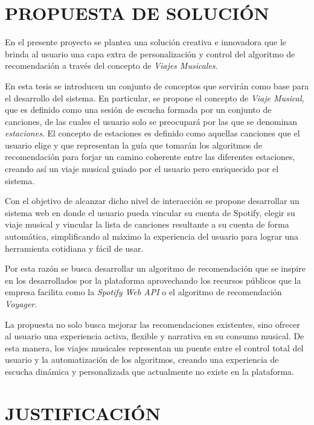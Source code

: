 \newpage

\section*{PROPUESTA DE SOLUCIÓN}

En el presente proyecto se plantea una solución creativa e innovadora que le brinda al usuario una capa extra de personalización y control del algoritmo de recomendación a través del concepto de \textit{Viajes Musicales}.

En esta tesis se introducen un conjunto de conceptos que servirán como base para el desarrollo del sistema. En particular, se propone el concepto de \textit{Viaje Musical}, que es definido como una sesión de escucha formada por un conjunto de canciones, de las cuales el usuario solo se preocupará por las que se denominan \textit{estaciones}. El concepto de estaciones es definido como  aquellas canciones que el usuario elige y que representan la guía que tomarán los algoritmos de recomendación para forjar un camino coherente entre las diferentes estaciones, creando así un viaje musical guiado por el usuario pero enriquecido por el sistema.

Con el objetivo de alcanzar dicho nivel de interacción se propone desarrollar un sistema web en donde el usuario pueda vincular su cuenta de Spotify, elegir su viaje musical y vincular la lista de canciones resultante a su cuenta de forma automática, simplificando al máximo la experiencia del usuario para lograr una herramienta cotidiana y fácil de usar.

Por esta razón se busca desarrollar un algoritmo de recomendación que se inspire en los desarrollados por la plataforma aprovechando los recursos públicos que la empresa facilita como la \textit{Spotify Web API} o el algoritmo de recomendación \textit{Voyager}.

La propuesta no solo busca mejorar las recomendaciones existentes, sino ofrecer al usuario una experiencia activa, flexible y narrativa en su consumo musical. De esta manera, los viajes musicales representan un puente entre el control total del usuario y la automatización de los algoritmos, creando una experiencia de escucha dinámica y personalizada que actualmente no existe en la plataforma.

\newpage

\section*{JUSTIFICACIÓN}



